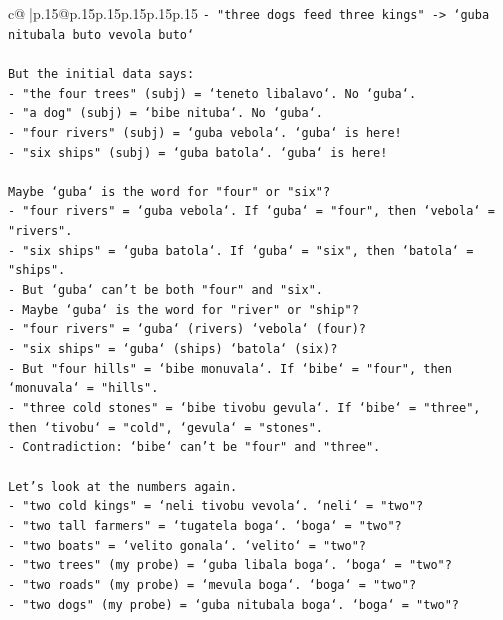 \documentclass{article}
\begin{document}
{\begin{supertabular}{c@{$\;$}|p{.15\linewidth}@{}p{.15\linewidth}p{.15\linewidth}p{.15\linewidth}p{.15\linewidth}p{.15\linewidth}}
{{{\texttt{{-} "three dogs feed three kings" {-}> `guba nitubala buto vevola buto`} \\
\\ 
\texttt{But the initial data says:} \\
\texttt{{-} "the four trees" (subj) = `teneto libalavo`. No `guba`.} \\
\texttt{{-} "a dog" (subj) = `bibe nituba`. No `guba`.} \\
\texttt{{-} "four rivers" (subj) = `guba vebola`. `guba` is here!} \\
\texttt{{-} "six ships" (subj) = `guba batola`. `guba` is here!} \\
\\ 
\texttt{Maybe `guba` is the word for "four" or "six"?} \\
\texttt{{-} "four rivers" = `guba vebola`. If `guba` = "four", then `vebola` = "rivers".} \\
\texttt{{-} "six ships" = `guba batola`. If `guba` = "six", then `batola` = "ships".} \\
\texttt{{-} But `guba` can't be both "four" and "six".} \\
\texttt{{-} Maybe `guba` is the word for "river" or "ship"?} \\
\texttt{{-} "four rivers" = `guba` (rivers) `vebola` (four)?} \\
\texttt{{-} "six ships" = `guba` (ships) `batola` (six)?} \\
\texttt{{-} But "four hills" = `bibe monuvala`. If `bibe` = "four", then `monuvala` = "hills".} \\
\texttt{{-} "three cold stones" = `bibe tivobu gevula`. If `bibe` = "three", then `tivobu` = "cold", `gevula` = "stones".} \\
\texttt{{-} Contradiction: `bibe` can't be "four" and "three".} \\
\\ 
\texttt{Let's look at the numbers again.} \\
\texttt{{-} "two cold kings" = `neli tivobu vevola`. `neli` = "two"?} \\
\texttt{{-} "two tall farmers" = `tugatela boga`. `boga` = "two"?} \\
\texttt{{-} "two boats" = `velito gonala`. `velito` = "two"?} \\
\texttt{{-} "two trees" (my probe) = `guba libala boga`. `boga` = "two"?} \\
\texttt{{-} "two roads" (my probe) = `mevula boga`. `boga` = "two"?} \\
\texttt{{-} "two dogs" (my probe) = `guba nitubala boga`. `boga` = "two"?} \\
}}}
\end{supertabular}}
\end{document}
